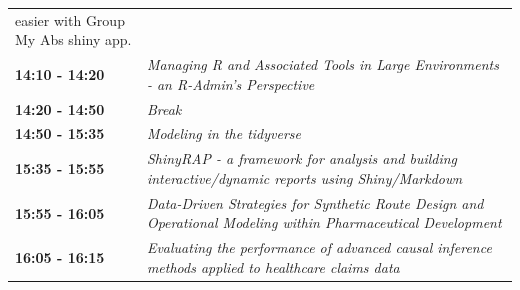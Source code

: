 \documentclass[]{book}
\theoremstyle{definition}
\theoremstyle{definition}
\theoremstyle{definition}
\theoremstyle{remark}
\begin{document}
\begin{longtable}[]{@{}ll@{}}
\begin{minipage}[t]{0.47\columnwidth}
{easier with Group My Abs shiny app.}\strut
\end{minipage}\tabularnewline
\begin{minipage}[t]{0.47\columnwidth}\raggedright
\textbf{14:10 - 14:20}\strut
\end{minipage} & \begin{minipage}[t]{0.47\columnwidth}\raggedright
\emph{Managing R and Associated Tools in Large Environments - an
R-Admin's Perspective}\strut
\end{minipage}\tabularnewline
\begin{minipage}[t]{0.47\columnwidth}\raggedright
\textbf{14:20 - 14:50}\strut
\end{minipage} & \begin{minipage}[t]{0.47\columnwidth}\raggedright
\emph{Break}\strut
\end{minipage}\tabularnewline
\begin{minipage}[t]{0.47\columnwidth}\raggedright
\textbf{14:50 - 15:35}\strut
\end{minipage} & \begin{minipage}[t]{0.47\columnwidth}\raggedright
\emph{Modeling in the tidyverse}\strut
\end{minipage}\tabularnewline
\begin{minipage}[t]{0.47\columnwidth}\raggedright
\textbf{15:35 - 15:55}\strut
\end{minipage} & \begin{minipage}[t]{0.47\columnwidth}\raggedright
\emph{ShinyRAP - a framework for analysis and building
interactive/dynamic reports using Shiny/Markdown}\strut
\end{minipage}\tabularnewline
\begin{minipage}[t]{0.47\columnwidth}\raggedright
\textbf{15:55 - 16:05}\strut
\end{minipage} & \begin{minipage}[t]{0.47\columnwidth}\raggedright
\emph{Data-Driven Strategies for Synthetic Route Design and Operational
Modeling within Pharmaceutical Development}\strut
\end{minipage}\tabularnewline
\begin{minipage}[t]{0.47\columnwidth}\raggedright
\textbf{16:05 - 16:15}\strut
\end{minipage} & \begin{minipage}[t]{0.47\columnwidth}\raggedright
\emph{Evaluating the performance of advanced causal inference methods
applied to healthcare claims data}\strut
\end{minipage}\tabularnewline

\end{longtable}
\end{document}
